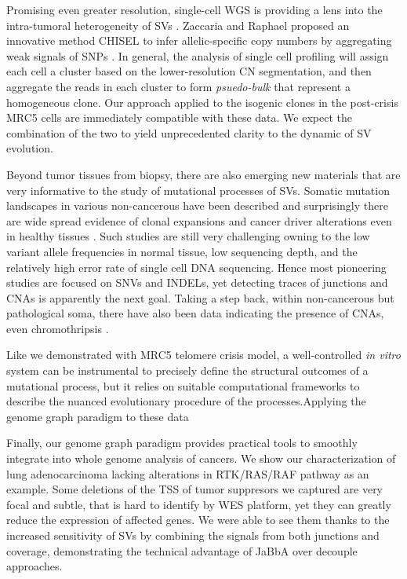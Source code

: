 \documentclass[phd,tocprelim]{cornell}
\begin{document}
Promising even greater resolution, single-cell WGS is providing a lens into the intra-tumoral heterogeneity of SVs \cite{Zaccaria2020-bn,laks2019,Salehi2021-xi}. Zaccaria and Raphael proposed an innovative method CHISEL to infer allelic-specific copy numbers by aggregating weak signals of SNPs . In general, the analysis of single cell profiling will assign each cell a cluster based on the lower-resolution CN segmentation, and then aggregate the reads in each cluster to form \textit{psuedo-bulk} that represent a homogeneous clone. Our approach applied to the isogenic clones in the post-crisis MRC5 cells are immediately compatible with these data. We expect the combination of the two to yield unprecedented clarity to the dynamic of SV evolution.

Beyond tumor tissues from biopsy, there are also emerging new materials that are very informative to the study of mutational processes of SVs. Somatic mutation landscapes in various non-cancerous have been described and surprisingly there are wide spread evidence of clonal expansions and cancer driver alterations even in healthy tissues \cite{Martincorena:2018fk}. Such studies are still very challenging owning to the low variant allele frequencies in normal tissue, low sequencing depth, and the relatively high error rate of single cell DNA sequencing. Hence most pioneering studies are focused on SNVs and INDELs, yet detecting traces of junctions and CNAs is apparently the next goal. Taking a step back, within non-cancerous but pathological soma, there have also been data indicating the presence of CNAs, even chromothripsis \cite{McDermott2015-xc}.

Like we demonstrated with MRC5 telomere crisis model, a well-controlled \textit{in vitro} system can be instrumental to precisely define the structural outcomes of a mutational process, but it relies on suitable computational frameworks to describe the nuanced evolutionary procedure of the processes.Applying the genome graph paradigm to these data 

Finally, our genome graph paradigm provides practical tools to smoothly integrate into whole genome analysis of cancers. We show our characterization of lung adenocarcinoma lacking alterations in RTK/RAS/RAF pathway as an example. Some deletions of the TSS of tumor suppresors we captured are very focal and subtle, that is hard to identify by WES platform, yet they can greatly reduce the expression of affected genes. We were able to see them thanks to the increased sensitivity of SVs by combining the signals from both junctions and coverage, demonstrating the technical advantage of JaBbA over decouple approaches.
\end{document}
